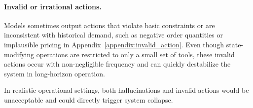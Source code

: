   
\paragraph{Invalid or irrational actions.}
Models sometimes output actions that violate basic constraints or are inconsistent with historical demand, such as negative order quantities or implausible pricing in Appendix~\ref{appendix:invalid_action}. Even though state-modifying operations are restricted to only a small set of tools, these invalid actions occur with non-negligible frequency and can quickly destabilize the system in long-horizon operation.

In realistic operational settings, both hallucinations and invalid actions would be unacceptable and could directly trigger system collapse.

